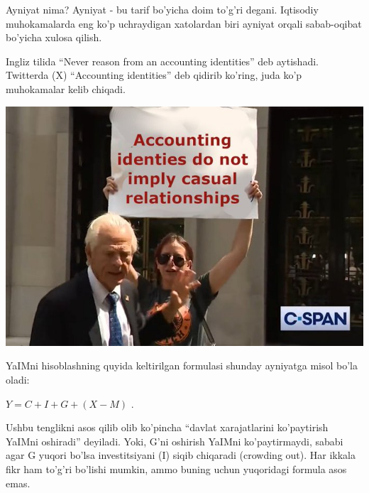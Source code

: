 \documentclass[
  letterpaper,
  DIV=11,
  numbers=noendperiod,
  oneside]{scrreprt}
\begin{document}

Ayniyat nima? Ayniyat - bu tarif bo'yicha doim to'g'ri degani. Iqtisodiy
muhokamalarda eng ko'p uchraydigan xatolardan biri ayniyat orqali
sabab-oqibat bo'yicha xulosa qilish.

Ingliz tilida ``Never reason from an accounting identities'' deb
aytishadi. Twitterda (X) ``Accounting identities'' deb qidirib ko'ring,
juda ko'p muhokamalar kelib chiqadi.

\begin{marginfigure}

{\centering \includegraphics{GFxc02uWcAASvTq.jpeg}

}

\end{marginfigure}

YaIMni hisoblashning quyida keltirilgan formulasi shunday ayniyatga
misol bo'la oladi:

\(Y = C + I + G+(X-M)\) .


Ushbu tenglikni asos qilib olib ko'pincha ``davlat xarajatlarini
ko'paytirish YaIMni oshiradi'' deyiladi. Yoki, G'ni oshirish YaIMni
ko'paytirmaydi, sababi agar G yuqori bo'lsa investitsiyani (I) siqib
chiqaradi (crowding out). Har ikkala fikr ham to'g'ri bo'lishi mumkin,
ammo buning uchun yuqoridagi formula asos emas.
\end{document}
